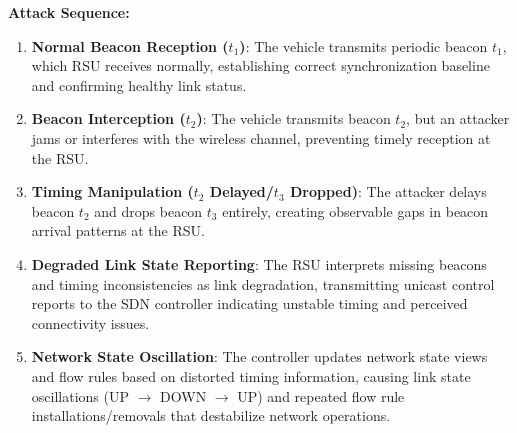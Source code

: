 \textbf{Attack Sequence:}
\begin{enumerate}
    \item \textbf{Normal Beacon Reception ($t_1$)}: The vehicle transmits periodic beacon $t_1$, which RSU receives normally, establishing correct synchronization baseline and confirming healthy link status.
    
    \item \textbf{Beacon Interception ($t_2$)}: The vehicle transmits beacon $t_2$, but an attacker jams or interferes with the wireless channel, preventing timely reception at the RSU.
    
    \item \textbf{Timing Manipulation ($t_2$ Delayed/$t_3$ Dropped)}: The attacker delays beacon $t_2$ and drops beacon $t_3$ entirely, creating observable gaps in beacon arrival patterns at the RSU.
    
    \item \textbf{Degraded Link State Reporting}: The RSU interprets missing beacons and timing inconsistencies as link degradation, transmitting unicast control reports to the SDN controller indicating unstable timing and perceived connectivity issues.
    
    \item \textbf{Network State Oscillation}: The controller updates network state views and flow rules based on distorted timing information, causing link state oscillations (UP $\rightarrow$ DOWN $\rightarrow$ UP) and repeated flow rule installations/removals that destabilize network operations.
\end{enumerate}


